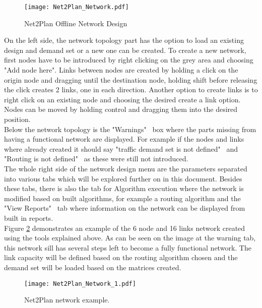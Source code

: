 	\begin{figure}[h!]
		\centering
		\texttt{[image: Net2Plan\_Network.pdf]}
		\caption{Net2Plan Offline Network Design}
		\label{Net2Plan_Network}
	\end{figure}
	
	On the left side, the network topology part has the option to load an existing design and demand set or a new one can be created. To create a new network, first nodes have to be introduced by right clicking on the grey area and choosing "Add node here". Links between nodes are created by holding a click on the origin node and dragging until the destination node, holding shift before releasing the click creates 2 links, one in each direction. Another option to create links is to right click on an existing node and choosing the desired create a link option. Nodes can be moved by holding control and dragging them into the desired position.\\
	
	Below the network topology is the "Warnings" \ box where the parts missing from having a functional network are displayed. For example if the nodes and links where already created it should say "traffic demand set is not defined" \ and "Routing is not defined" \ as these were still not introduced.\\
	
	The whole right side of the network design menu are the parameters separated into various tabs which will be explored further on in this document. Besides these tabs, there is also the tab for Algorithm execution where the network is modified based on built algorithms, for example a routing algorithm and the "View Reports" \ tab where information on the network can be displayed from built in reports. \\

	Figure \ref{Net2Plan_Network_1} demonstrates an example of the 6 node and 16 links network created using the tools explained above. As can be seen on the image at the warning tab, this network sill has several steps left to become a fully functional network. The link capacity will be defined based on the routing algorithm chosen and the demand set will be loaded based on the matrices created. \\
		
	\begin{figure}[h!]
		\centering
		\texttt{[image: Net2Plan\_Network\_1.pdf]}
		\caption{Net2Plan network example.}
		\label{Net2Plan_Network_1}
	\end{figure}

